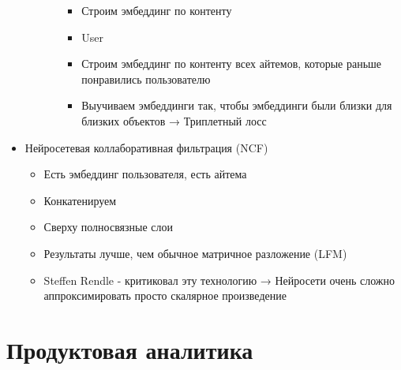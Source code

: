 \documentclass[a4paper, 12pt]{article}
\begin{document}
\begin{itemize}
\begin{itemize}
\begin{itemize}
\begin{itemize}
      \item
        
        Строим эмбеддинг по контенту
          
      \item
        
        User
        

      \item Строим эмбеддинг по контенту всех айтемов, которые раньше
          понравились пользователю
          
      \item
        
        Выучиваем эмбеддинги так, чтобы эмбеддинги были близки для
        близких объектов → Триплетный лосс
        
      \end{itemize}
    \end{itemize}
  \end{itemize}
\item
  
  Нейросетевая коллаборативная фильтрация (NCF)
  

  \begin{itemize}
  \item
    
    Есть эмбеддинг пользователя, есть айтема
    
  \item
    
    Конкатенируем
    
  \item
    
    Сверху полносвязные слои
    
  \item
    
    Результаты лучше, чем обычное матричное разложение (LFM)
    
  \item
    
    Steffen Rendle - критиковал эту технологию → Нейросети очень сложно
    аппроксимировать просто скалярное произведение
    
  \end{itemize}
\end{itemize}

\section{\texorpdfstring{\textbf{Продуктовая
аналитика}}{Продуктовая аналитика}}\label{ux43fux440ux43eux434ux443ux43aux442ux43eux432ux430ux44f-ux430ux43dux430ux43bux438ux442ux438ux43aux430}
\end{document}
